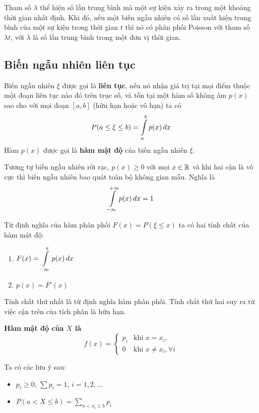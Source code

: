 Tham số $\lambda$ thể hiện số lần trung bình mà một sự kiện xảy ra trong một khoảng thời gian nhất định. Khi đó, nếu một biến ngẫu nhiên có số lần xuất hiện trung bình của một sự kiện trong thời gian $t$ thì nó có phân phối Poisson với tham số $\lambda t$, với $\lambda$ là số lần trung bình trong một đơn vị thời gian.

\subsection*{Biến ngẫu nhiên liên tục}

\begin{definition}
    Biến ngẫu nhiên $\xi$ được gọi là \textbf{liên tục}, nếu nó nhận giá trị tại mọi điểm thuộc một đoạn liên tục nào đó trên trục số, và tồn tại một hàm số không âm $p(x)$ sao cho với mọi đoạn $[a ,b]$ (hữu hạn hoặc vô hạn) ta có
    \begin{equation}
        P(a \leq \xi \leq b) = \int\displaylimits_{a}^{b} p(x)\, dx
    \end{equation}
    Hàm $p(x)$ được gọi là \textbf{hàm mật độ} của biến ngẫu nhiên $\xi$.
\end{definition}

Tương tự biến ngẫu nhiên rời rạc, $p(x) \geq 0$ với mọi $x \in \mathbb{R}$ và khi hai cận là vô cực thì biến ngẫu nhiên bao quát toàn bộ không gian mẫu. Nghĩa là \[ \int\displaylimits_{-\infty}^{+\infty} p(x)\, dx = 1 \]

Từ định nghĩa của hàm phân phối $F(x) = P(\xi \leq x)$ ta có hai tính chất của hàm mật độ:

\begin{enumerate}
    \item $\displaystyle{F(x) = \int\displaylimits_{-\infty}^{x} p(x)\, dx}$
    \item $p(x) = F'(x)$
\end{enumerate}

Tính chất thứ nhất là từ định nghĩa hàm phân phối. Tính chất thứ hai suy ra từ việc cận trên của tích phân là hữu hạn.

\textbf{Hàm mật độ của $X$ là} \[f(x) = \begin{cases}
        p_i & \text{khi } x = x_i, \\
        0 & \text{khi } x \neq x_i, \forall i
\end{cases}\]

\begin{remark}
    Ta có các lưu ý sau:
    \begin{itemize}
        \item $p_i \geq 0$, $\sum p_i = 1$, $i = 1, 2, \ldots$
    
        \item $\displaystyle{P(a < X \leq b) = \sum_{a < x_i \leq b} p_i}$
    \end{itemize}
\end{remark}

